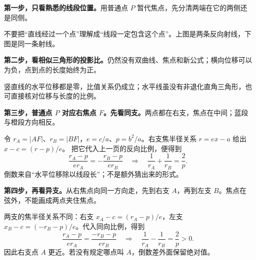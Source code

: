 \clearpage
\begin{explanationbox}
\textbf{第一步，只看熟悉的线段位置。}用普通点 $P$ 暂代焦点，先分清两端在它的两侧还是同侧。\begin{center}\end{center}
不要把“直线经过一个点”理解成“线段一定包含这个点”。上图是两条反向射线，下图是同一条射线。
\end{explanationbox}
\clearpage
\begin{explanationbox}
\textbf{第二步，看相似三角形的投影比。}仍然没有双曲线、焦点和新公式；横向位移可以为负，点到点的长度始终为正。\begin{center}\end{center}
竖直线的水平位移都是零，比值关系仍成立；水平线虽没有非退化直角三角形，也可直接核对位移与长度的比例。
\end{explanationbox}
\clearpage
\begin{explanationbox}
\textbf{第三步，普通点 $P$ 对应右焦点 $F$。先看同支。}两点都在右支，焦点在中间；蓝段与橙段方向相反。\begin{center}\end{center}
令 $r_A=|AF|$、$r_B=|BF|$，$e=c/a$、$p=b^2/a$。右支焦半径关系 $r=ex-a$ 给出 $x-c=(r-p)/e$。
把它代入上一页的反向比例，便得到
\[
 \frac{r_A-p}{er_A}=-\frac{r_B-p}{er_B}
 \quad\Longrightarrow\quad \frac1{r_A}+\frac1{r_B}=\frac2p.
\]
倒数来自“水平位移除以线段长”；不是额外猜出来的形式。
\end{explanationbox}
\clearpage
\begin{explanationbox}
\textbf{第四步，再看异支。}从右焦点向同一方向走，先到右支 $A$，再到左支 $B$。焦点在弦外，不能画成两点夹住焦点。\begin{center}\end{center}
两支的焦半径关系不同：右支 $x_A-c=(r_A-p)/e$，左支 $x_B-c=(-r_B-p)/e$。代入同向比例，得到
\[
 \frac{r_A-p}{er_A}=\frac{-r_B-p}{er_B}
 \quad\Longrightarrow\quad \frac1{r_A}-\frac1{r_B}=\frac2p>0.
\]
因此右支点 $A$ 更近。若没有规定哪点叫 $A$，倒数差外面保留绝对值。
\end{explanationbox}

